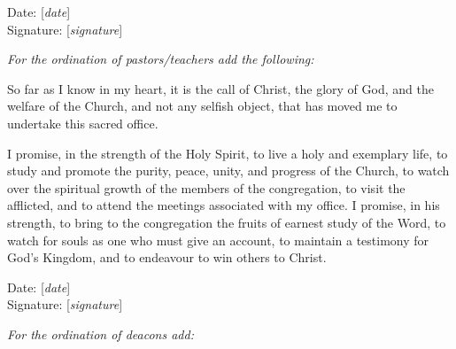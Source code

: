 \par Date: [\textit{date}]
\\Signature: [\textit{signature}]

\par\textit{For the ordination of pastors/teachers add the following:} 

\par So far as I know in my heart, it is the call of Christ, the glory of God, and the welfare of the Church, and not any selfish object, that has moved me to undertake this sacred office.

\par I promise, in the strength of the Holy Spirit, to live a holy and exemplary life, to study and promote the purity, peace, unity, and progress of the Church, to watch over the spiritual growth of the members of the congregation, to visit the afflicted, and to attend the meetings associated with my office. I promise, in his strength, to bring to the congregation the fruits of earnest study of the Word, to watch for souls as one who must give an account, to maintain a testimony for God's Kingdom, and to endeavour to win others to Christ.

\par Date: [\textit{date}]
\\Signature: [\textit{signature}]

\par\textit{For the ordination of deacons add:} 

